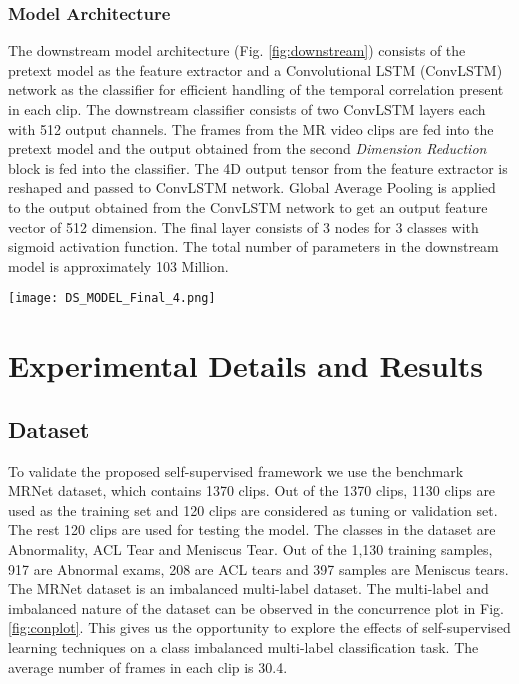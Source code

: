 \documentclass[journal]{IEEEtai}
\begin{document}
\subsubsection{Model Architecture}
\label{subsubsec:downstream_model_arch}

\indent The downstream model architecture (Fig. \ref{fig:downstream}) consists of the pretext model as the feature extractor and a Convolutional LSTM (ConvLSTM) network \cite{convlstm} as the classifier for efficient handling of the temporal correlation present in each clip. The downstream classifier consists of two ConvLSTM layers each with 512 output channels. The frames from the MR video clips are fed into the pretext model and the output obtained from the second \textit{Dimension Reduction} block is fed into the classifier. The 4D output tensor from the feature extractor is reshaped and passed to ConvLSTM network. Global Average Pooling is applied to the output obtained from the ConvLSTM network to get an output feature vector of 512 dimension. The final layer consists of 3 nodes for 3 classes with sigmoid activation function. The total number of parameters in the downstream model is approximately 103 Million.

\begin{figure*}[ht]
\begin{minipage}{\textwidth}
    \centering
    \texttt{[image: DS\_MODEL\_Final\_4.png]}
    \caption{Network model used for the downstream task. The figure is best visible in 200\% scale.}
    \label{fig:downstream}
\end{minipage}
\end{figure*}

\section{Experimental Details and Results}
\label{sec:exp}

\subsection{Dataset}
\label{subsec:dataset}

To validate the proposed self-supervised framework we use the benchmark MRNet \cite{mrnet} dataset, which contains 1370 clips. Out of the 1370 clips, 1130 clips are used as the training set and 120 clips are considered as tuning or validation set. The rest 120 clips are used for testing the model. The classes in the dataset are Abnormality, ACL Tear and Meniscus Tear. Out of the 1,130 training samples, 917 are Abnormal exams, 208 are ACL tears and 397 samples are Meniscus tears. The MRNet \cite{mrnet} dataset is an imbalanced multi-label dataset. The multi-label and imbalanced nature of the dataset can be observed in the concurrence plot in Fig. \ref{fig:conplot}. This gives us the opportunity to explore the effects of self-supervised learning techniques on a class imbalanced multi-label classification task. The average number of frames in each clip is 30.4. 
\end{document}
